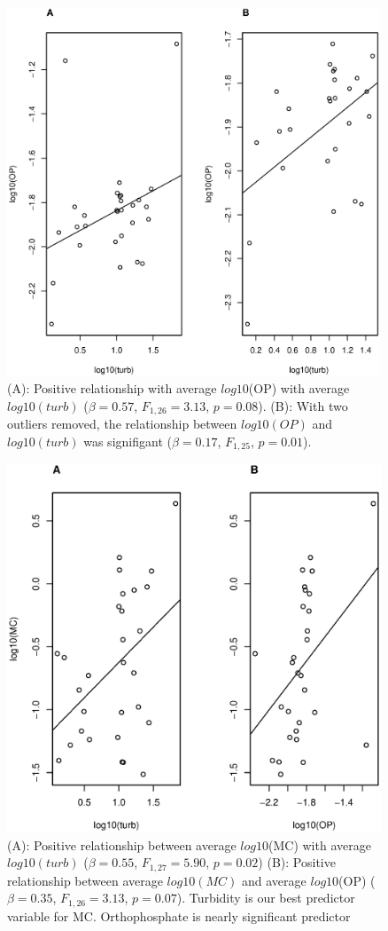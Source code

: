\begin{figure}
\includegraphics[width=\textwidth, height=11cm]{figures/plot1}
\caption{
(A): Positive relationship with average $log10$(OP) with average $log10(turb)$ ($\beta=0.57$, $F_{{1,26}}=3.13$, $p=0.08$).
(B): With two outliers removed, the relationship between $log10(OP)$ and $log10(turb)$ was signifigant  ($\beta=0.17$, $F_{{1,25}}$, $p=0.01$).
}
\label{fig:plot1}
\end{figure}

\begin{figure}
\includegraphics[width=\textwidth, height=11cm]{figures/plot2}
\caption{
(A): Positive relationship between average $log10$(MC) with average $log10(turb)$ ($\beta=0.55$, $F_{{1,27}}=5.90$, $p=0.02$)
(B): Positive relationship between average $log10(MC)$ and average  $log10$(OP) ($\beta=0.35$, $F_{{1,26}}=3.13$, $p=0.07$). 
Turbidity is our best predictor variable for MC. Orthophosphate is nearly significant predictor}
\label{fig:plot2}
\end{figure}

